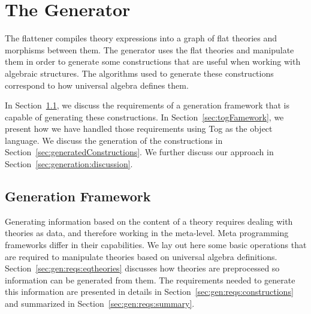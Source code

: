 \chapter{The Generator}
\label{ch:generation}

The flattener compiles theory expressions into a graph of flat theories and morphisms between them. The generator uses the flat theories and manipulate them in order to generate some constructions that are useful when working with algebraic structures. The algorithms used to generate these constructions correspond to how universal algebra defines them.

In Section~\ref{sec:genFrameReqs}, we discuss the requirements of a generation framework that is capable of generating these constructions. In Section~\ref{sec:togFamework}, we present how we have handled those requirements using Tog as the object language. We discuss the generation of the constructions in Section~\ref{sec:generatedConstructions}. We further discuss our approach in Section~\ref{sec:generation:discussion}. 

\section{Generation Framework}
\label{sec:genFrameReqs}

Generating information based on the content of a theory requires dealing with theories as data, and therefore working in the meta-level. Meta programming frameworks differ in their capabilities. We lay out here some basic operations that are required to manipulate theories based on universal algebra definitions.  Section~\ref{sec:gen:reqs:eqtheories} discusses how theories are preprocessed so information can be generated from them. The requirements needed to generate this information are presented in details in Section~\ref{sec:gen:reqs:constructions} and summarized in Section~\ref{sec:gen:reqs:summary}. 


